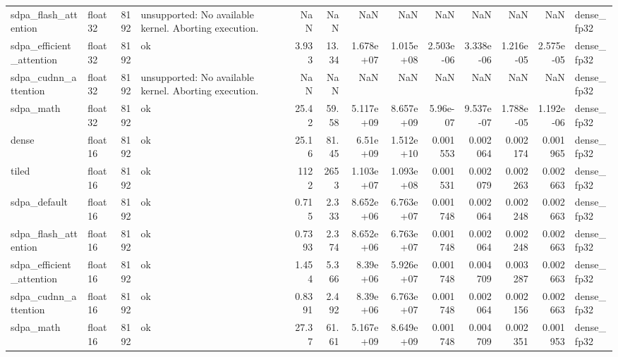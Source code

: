 \begin{table}
\begin{tabular}{llrlrrrrrrrrl}
sdpa\_flash\_attention & float32 & 8192 & unsupported: No available kernel. Aborting execution. & NaN & NaN & NaN & NaN & NaN & NaN & NaN & NaN & dense\_fp32 \\
sdpa\_efficient\_attention & float32 & 8192 & ok & 3.933 & 13.34 & 1.678e+07 & 1.015e+08 & 2.503e-06 & 3.338e-06 & 1.216e-05 & 2.575e-05 & dense\_fp32 \\
sdpa\_cudnn\_attention & float32 & 8192 & unsupported: No available kernel. Aborting execution. & NaN & NaN & NaN & NaN & NaN & NaN & NaN & NaN & dense\_fp32 \\
sdpa\_math & float32 & 8192 & ok & 25.42 & 59.58 & 5.117e+09 & 8.657e+09 & 5.96e-07 & 9.537e-07 & 1.788e-05 & 1.192e-06 & dense\_fp32 \\
dense & float16 & 8192 & ok & 25.16 & 81.45 & 6.51e+09 & 1.512e+10 & 0.001553 & 0.002064 & 0.002174 & 0.001965 & dense\_fp32 \\
tiled & float16 & 8192 & ok & 1122 & 2653 & 1.103e+07 & 1.093e+08 & 0.001531 & 0.002079 & 0.002263 & 0.002663 & dense\_fp32 \\
sdpa\_default & float16 & 8192 & ok & 0.715 & 2.333 & 8.652e+06 & 6.763e+07 & 0.001748 & 0.002064 & 0.002248 & 0.002663 & dense\_fp32 \\
sdpa\_flash\_attention & float16 & 8192 & ok & 0.7393 & 2.374 & 8.652e+06 & 6.763e+07 & 0.001748 & 0.002064 & 0.002248 & 0.002663 & dense\_fp32 \\
sdpa\_efficient\_attention & float16 & 8192 & ok & 1.454 & 5.366 & 8.39e+06 & 5.926e+07 & 0.001748 & 0.004709 & 0.003287 & 0.002663 & dense\_fp32 \\
sdpa\_cudnn\_attention & float16 & 8192 & ok & 0.8391 & 2.492 & 8.39e+06 & 6.763e+07 & 0.001748 & 0.002064 & 0.002156 & 0.002663 & dense\_fp32 \\
sdpa\_math & float16 & 8192 & ok & 27.37 & 61.61 & 5.167e+09 & 8.649e+09 & 0.001748 & 0.004709 & 0.002351 & 0.001953 & dense\_fp32 \\
\bottomrule
\end{tabular}
\end{table}
